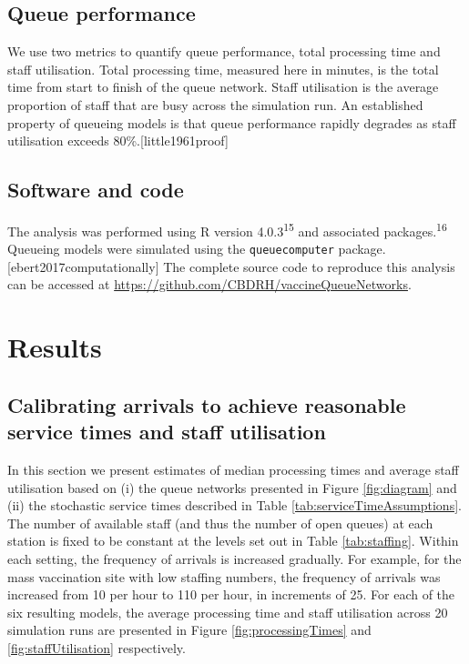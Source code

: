 \documentclass{article}
\begin{document}
\hypertarget{queue-performance}{%
\subsection{Queue performance}\label{queue-performance}}

We use two metrics to quantify queue performance, total processing time
and staff utilisation. Total processing time, measured here in minutes,
is the total time from start to finish of the queue network. Staff
utilisation is the average proportion of staff that are busy across the
simulation run. An established property of queueing models is that queue
performance rapidly degrades as staff utilisation exceeds
80\%.{[}little1961proof{]}

\hypertarget{software-and-code}{%
\subsection{Software and code}\label{software-and-code}}

The analysis was performed using R version 4.0.3\textsuperscript{15} and
associated packages.\textsuperscript{16} Queueing models were simulated
using the \texttt{queuecomputer} package.{[}ebert2017computationally{]}
The complete source code to reproduce this analysis can be accessed at
\url{https://github.com/CBDRH/vaccineQueueNetworks}.

\hypertarget{results}{%
\section{Results}\label{results}}

\hypertarget{calibrating-arrivals-to-achieve-reasonable-service-times-and-staff-utilisation}{%
\subsection{Calibrating arrivals to achieve reasonable service times and
staff
utilisation}\label{calibrating-arrivals-to-achieve-reasonable-service-times-and-staff-utilisation}}

In this section we present estimates of median processing times and
average staff utilisation based on (i) the queue networks presented in
Figure \ref{fig:diagram} and (ii) the stochastic service times described
in Table \ref{tab:serviceTimeAssumptions}. The number of available staff
(and thus the number of open queues) at each station is fixed to be
constant at the levels set out in Table \ref{tab:staffing}. Within each
setting, the frequency of arrivals is increased gradually. For example,
for the mass vaccination site with low staffing numbers, the frequency
of arrivals was increased from 10 per hour to 110 per hour, in
increments of 25. For each of the six resulting models, the average
processing time and staff utilisation across 20 simulation runs are
presented in Figure \ref{fig:processingTimes} and
\ref{fig:staffUtilisation} respectively.
\end{document}
